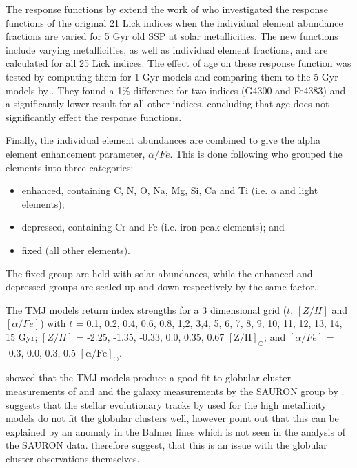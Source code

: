 			The response functions by \citet{Korn2005} extend the work of \citet{Tripicco1995} who investigated the response functions of the original 21 Lick indices when the individual element abundance fractions are varied for 5 Gyr old SSP at solar metallicities. The new functions include varying metallicities, as well as individual element fractions, and are calculated for all 25 Lick indices. The effect of age on these response function was tested by computing them for 1 Gyr models and comparing them to the 5 Gyr models by \citet{Tripicco1995}. They found a 1\% difference for two indices (G4300 and Fe4383) and a significantly lower result for all other indices, concluding that age does not significantly effect the response functions.

			Finally, the individual element abundances are combined to give the alpha element enhancement parameter, $\alpha/Fe$. This is done following \citet{Trager2000} who grouped the elements into three categories: 
			\begin{itemize}
				\item enhanced, containing C, N, O, Na, Mg, Si, Ca and Ti (i.e. $\alpha$ and light elements); 
				\item depressed, containing Cr and Fe (i.e. iron peak elements); and
				\item fixed (all other elements). 
			\end{itemize}
			The fixed group are held with solar abundances, while the enhanced and depressed groups are scaled up and down respectively by the same factor. 

			The TMJ models return index strengths for a 3 dimensional grid ($t$, $[Z/H]$ and $[\alpha/Fe]$) with $t$ = 0.1, 0.2, 0.4, 0.6, 0.8, 1,2, 3,4, 5, 6, 7, 8, 9, 10, 11, 12, 13, 14, 15 Gyr; $[Z/H]$ = -2.25, -1.35, -0.33, 0.0, 0.35, 0.67 $\mathrm{[Z/H]_\odot}$; and $[\alpha/Fe]$ = -0.3, 0.0, 0.3, 0.5 $\mathrm{[\alpha/Fe]_\odot}$.

			\citet{Thomas2010} showed that the TMJ models produce a good fit to globular cluster measurements of \citet{Puzia2002} and \citet{Schiavon2005} and the galaxy measurements by the SAURON group by \citet{Kuntschner2010}. \citet{Conroy2010} suggests that the stellar evolutionary tracks by \citet{Girardi2000} used for the high metallicity models do not fit the globular clusters well, however \citet{Thomas2010} point out that this can be explained by an anomaly in the Balmer lines which is not seen in the analysis of the SAURON data. \citet{Thomas2010} therefore suggest, that this is an issue with the globular cluster observations themselves. 

